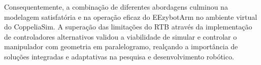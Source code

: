 Consequentemente, a combinação de diferentes abordagens culminou na modelagem satisfatória e na operação eficaz do EEzybotArm no ambiente virtual do CoppeliaSim. A superação das limitações do RTB através da implementação de controladores alternativos validou a viabilidade de simular e controlar o manipulador com geometria em paralelogramo, realçando a importância de soluções integradas e adaptativas na pesquisa e desenvolvimento robótico.
\begin{comment}

\section{Seção de exemplo 1 - Códigos} \label{sec:resex1}

\subsection{Subseção de exemplo 1 - Inserindo trechos de códigos}
 
O nosso querido Leonardo Cavalcante providenciou um comando que deixa nossos trechos de códigos bonitinhos e gera um elemento pré-textual de Lista de Códigos. 

Os códigos são adicionados através do comando seguinte:

\textbackslash sourcecode\{ Descrição \}\{Label\}\{Linguagem\}\{Arquivo com extensão\}

Um exemplo pode ser visto no código \ref{cmd:cron} abaixo.

\sourcecode{Configuração do intervalo de execução no Script Agendador}{cron}{javascript}{cron.js}


\section{Seção de exemplo 2 - Listas} \label{sec:resex2}

\subsection{Subseção de exemplo 2 - Lista de itens} 

Existem alguns tipos de listas no Latex, iremos exemplificar a lista sem numeração (seção \ref{subsubsec:itemize}), a lista enumerada (seção \ref{subsubsec:enumerate}) e a lista mista (seção \ref{subsubsec:mista}). As listas podem ser encadeadas de diversas maneiras,
de acordo com a necessidade do autor.

\subsubsection{Subsubseção de exemplo 1 - Lista sem numeração} \label{subsubsec:itemize}


\end{comment}
